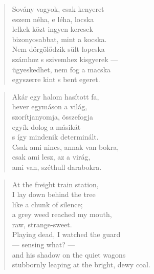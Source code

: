 \begin{verse}
  Sovány vagyok, csak kenyeret \\
  eszem néha, e léha, locska \\
  lelkek közt ingyen keresek \\
  bizonyosabbat, mint a kocska. \\
  Nem dörgölődzik sült lopcska \\
  számhoz s szivemhez kisgyerek --- \\
  ügyeskedhet, nem fog a macska \\
  egyszerre kint s bent egeret.
\end{verse}

\bigskip


\begin{verse}
  Akár egy halom hasított fa, \\
  hever egymáson a világ, \\
  szorítjanyomja, összefogja \\
  egyík dolog a másikát \\
  s így mindenik determinált. \\
  Csak ami nincs, annak van bokra, \\
  csak ami lesz, az a virág, \\
  ami van, széthull darabokra.
\end{verse}

\newpage

\vspace*{-15mm}
\centeredornament



\begin{verse}
  At the freight train station, \\
  I lay down behind the tree \\
  like a chunk of silence; \\
  a grey weed reached my mouth, \\
  raw, strange-sweet. \\
  Playing dead, I watched the guard \\
  --- sensing what? --- \\
  and his shadow on the quiet wagons \\
  stubbornly leaping at the bright, dewy coal.
\end{verse}


